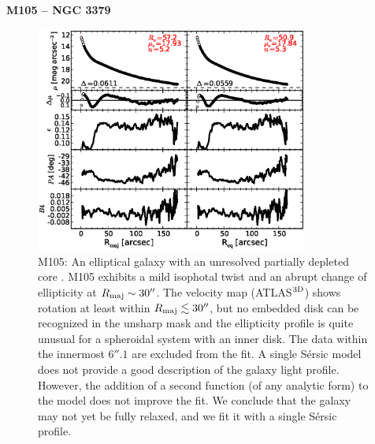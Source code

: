 \documentclass[preprint2]{emulateapj}
\newcommand{\fitfigurewidth}{0.8\textwidth}
\begin{document}
  \clearpage\newpage\noindent
  {\bf M105 -- NGC 3379 \\}

  \begin{figure}[h]
  \begin{center}
  \includegraphics[width=\fitfigurewidth]{m105_1Dfit.eps}
  \caption{M105: 
  An elliptical galaxy with an unresolved partially depleted core \citep{rusli2013}. %
  M105 exhibits a mild isophotal twist and an abrupt change of ellipticity at $R_{\rm maj} \sim 30''$.
  The velocity map (ATLAS$^{\rm 3D}$) shows rotation at least within $R_{\rm maj} \lesssim 30''$, 
  but no embedded disk can be recognized in the unsharp mask 
  and the ellipticity profile is quite unusual for a spheroidal system with an inner disk.
  The data within the innermost $6''.1$ are excluded from the fit.
  A single S\'ersic model does not provide a good description of the galaxy light profile.
  However, the addition of a second function (of any analytic form) to the model does not improve the fit.
  We conclude that the galaxy may not yet be fully relaxed, and we fit it with a single S\'ersic profile. 
  }
  \end{center}
  \end{figure}
\end{document}
